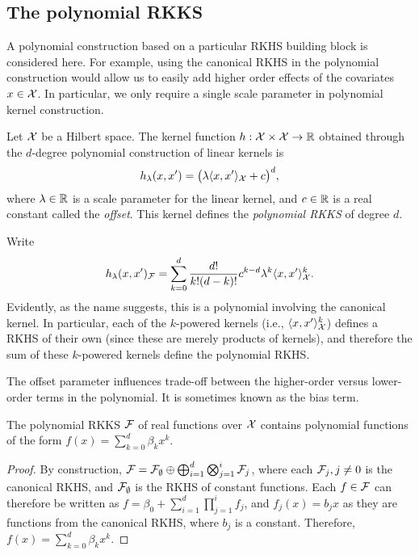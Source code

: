 \subsection{The polynomial RKKS}

A polynomial construction based on a particular RKHS building block is considered here.
For example, using the canonical RKHS in the polynomial construction would allow us to easily add higher order effects of the covariates $x \in {\mathcal X}$.
In particular, we only require a single scale parameter in polynomial kernel construction.

\begin{definition}
  Let ${\mathcal X}$ be a Hilbert space.
  The kernel function $h:{\mathcal X}\times{\mathcal X}\to\mathbb{R}$ obtained through the $d$-degree polynomial construction of linear kernels is
  \[
    h_\lambda(x,x') = \big(\lambda\langle x,x'\rangle_{\mathcal X} + c\big)^d,
  \]
  where $\lambda \in \mathbb{R}$ is a scale parameter for the linear kernel, and $c \in \mathbb{R}$ is a real constant called the \emph{offset}.
  This kernel defines the \emph{polynomial RKKS} of degree $d$.
\end{definition}

Write
\begin{align*}
  h_\lambda(x,x')_{\mathcal F} = \sum_{k=0}^d \frac{d!}{k!(d-k)!} c^{k-d} \lambda^k \langle x,x'\rangle_{\mathcal X}^k.
\end{align*}
Evidently, as the name suggests, this is a polynomial involving the canonical kernel.
In particular, each of the $k$-powered kernels (i.e., $\langle x,x'\rangle_{\mathcal X}^k$) defines a RKHS of their own (since these are merely products of kernels), and therefore the sum of these $k$-powered kernels define the polynomial RKHS.

The offset parameter influences trade-off between the higher-order versus lower-order terms in the polynomial.
It is sometimes known as the bias term.

\begin{proposition}
  The polynomial RKKS ${\mathcal F}$ of real functions over ${\mathcal X}$ contains polynomial functions of the form $f(x)=\sum_{k=0}^d \beta_k x^k$.
\end{proposition}

\begin{proof}
  By construction, ${\mathcal F} = {\mathcal F}_\emptyset \oplus \bigoplus_{i=1}^d\bigotimes_{j=1}^i {\mathcal F}_j$, where each ${\mathcal F}_j, j \neq 0$ is the canonical RKHS, and ${\mathcal F}_\emptyset$ is the RKHS of constant functions.
  Each $f \in {\mathcal F}$ can therefore be written as $f = \beta_0 + \sum_{i=1}^d\prod_{j=1}^i f_j$, and $f_j(x)= b_j x$ as they are functions from the canonical RKHS, where $b_j$ is a constant.
  Therefore, $f(x) = \sum_{k=0}^d \beta_k x^k$.
\end{proof}

